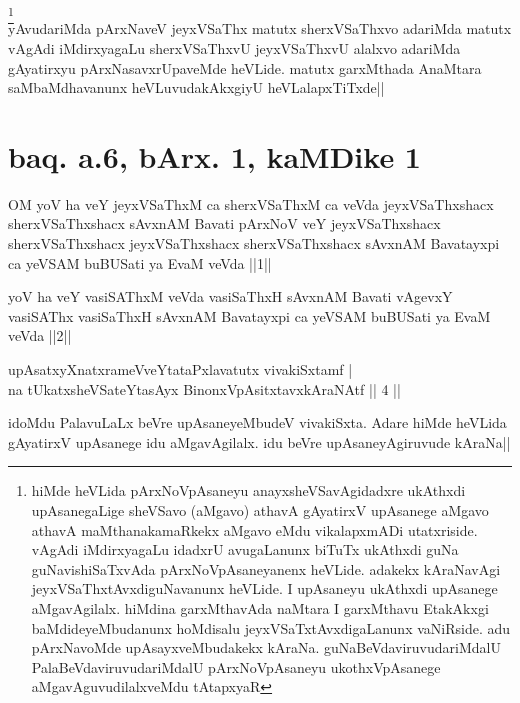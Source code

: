 \begin{artha} 
\footnote[2]{hiMde heVLida pArxNoVpAsaneyu anayxsheVSavAgidadxre 
ukAthxdi upAsanegaLige sheVSavo (aMgavo) athavA gAyatirxV upAsanege 
aMgavo athavA maMthanakamaRkekx aMgavo eMdu vikalapxmADi 
utatxriside. vAgAdi iMdirxyagaLu idadxrU avugaLanunx biTuTx ukAthxdi 
guNa guNavishiSaTxvAda pArxNoVpAsaneyanenx heVLide. adakekx kAraNavAgi 
jeyxVSaThxtAvxdiguNavanunx heVLide. I upAsaneyu ukAthxdi upAsanege 
aMgavAgilalx. hiMdina garxMthavAda naMtara I garxMthavu EtakAkxgi 
baMdideyeMbudanunx hoMdisalu jeyxVSaTxtAvxdigaLanunx vaNiRside. adu 
pArxNavoMde upAsayxveMbudakekx kAraNa. guNaBeVdaviruvudariMdalU 
PalaBeVdaviruvudariMdalU pArxNoVpAsaneyu ukothxVpAsanege 
aMgavAguvudilalxveMdu tAtapxyaR}\\
yAvudariMda pArxNaveV jeyxVSaThx matutx sherxVSaThxvo adariMda matutx 
vAgAdi iMdirxyagaLu sherxVSaThxvU jeyxVSaThxvU alalxvo adariMda 
gAyatirxyu pArxNasavxrUpaveMde heVLide. matutx garxMthada AnaMtara 
saMbaMdhavanunx heVLuvudakAkxgiyU heVLalapxTiTxde||
\end{artha}

\section*{baq. a.6, bArx. 1, kaMDike 1}

\begin{shl}
OM yoV ha veY jeyxVSaThxM ca sherxVSaThxM ca veVda jeyxVSaThxshacx sherxVSaThxshacx sAvxnAM Bavati pArxNoV veY jeyxVSaThxshacx sherxVSaThxshacx jeyxVSaThxshacx sherxVSaThxshacx sAvxnAM Bavatayxpi ca yeVSAM buBUSati ya EvaM veVda ||1||
\end{shl}


\begin{shl}
yoV ha veY vasiSAThxM veVda vasiSaThxH sAvxnAM Bavati vAgevxY vasiSAThx vasiSaThxH sAvxnAM Bavatayxpi ca yeVSAM buBUSati ya EvaM veVda ||2||
\end{shl}

\begin{shl}
upAsatxyXnatxrameVveYtataPxlavatutx vivakiSxtamf | \\
na tUkatxsheVSateYtasAyx BinonxVpAsitxtavxkAraNAtf \hfill|| 4 || 
\end{shl}

\begin{artha} 
idoMdu PalavuLaLx beVre upAsaneyeMbudeV vivakiSxta. Adare hiMde 
heVLida gAyatirxV upAsanege idu aMgavAgilalx. idu beVre 
upAsaneyAgiruvude kAraNa||
\end{artha}

